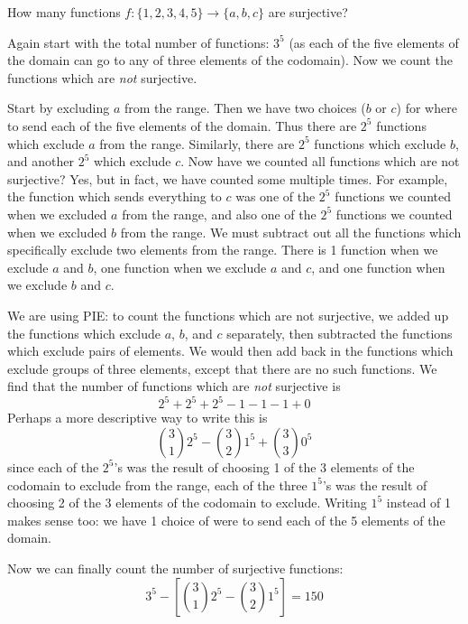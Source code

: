 \documentclass[12pt]{article}
\begin{document}
\begin{example}
  How many functions $f: \{1,2,3,4,5\} \to \{a,b,c\}$ are surjective?
  \begin{solution}
   Again start with the total number of functions: $3^5$ (as each of the five elements of the domain can go to any of three elements of the codomain).  Now we count the functions which are {\em not} surjective.
   
   Start by excluding $a$ from the range.  Then we have two choices ($b$ or $c$) for where to send each of the five elements of the domain.  Thus there are $2^5$ functions which exclude $a$ from the range.  Similarly, there are $2^5$ functions which exclude $b$, and another $2^5$ which exclude $c$.  Now have we counted all functions which are not surjective?  Yes, but in fact, we have counted some multiple times.  For example, the function which sends everything to $c$ was one of the $2^5$ functions we counted when we excluded $a$ from the range, and also one of the $2^5$ functions we counted when we excluded $b$ from the range.  We must subtract out all the functions which specifically exclude two elements from the range.  There is 1 function when we exclude $a$ and $b$, one function when we exclude $a$ and $c$, and one function when we exclude $b$ and $c$.  
   
   We are using PIE: to count the functions which are not surjective, we added up the functions which exclude $a$, $b$, and $c$ separately, then subtracted the functions which exclude pairs of elements.  We would then add back in the functions which exclude groups of three elements, except that there are no such functions.  We find that the number of functions which are {\em not} surjective is
   \[2^5 + 2^5 + 2^5 - 1 - 1 - 1 + 0\]
   Perhaps a more descriptive way to write this is
   \[{3 \choose 1}2^5 - {3 \choose 2}1^5 + {3 \choose 3}0^5\]
   since each of the $2^5$'s was the result of choosing 1 of the 3 elements of the codomain to exclude from the range, each of the three $1^5$'s was the result of choosing 2 of the 3 elements of the codomain to exclude.  Writing $1^5$ instead of 1 makes sense too: we have 1 choice of were to send each of the 5 elements of the domain.
   
   Now we can finally count the number of surjective functions:
   \[3^5 - \left[{3 \choose 1}2^5 - {3 \choose 2}1^5\right] = 150\]
  \end{solution}

\end{example}
\end{document}
